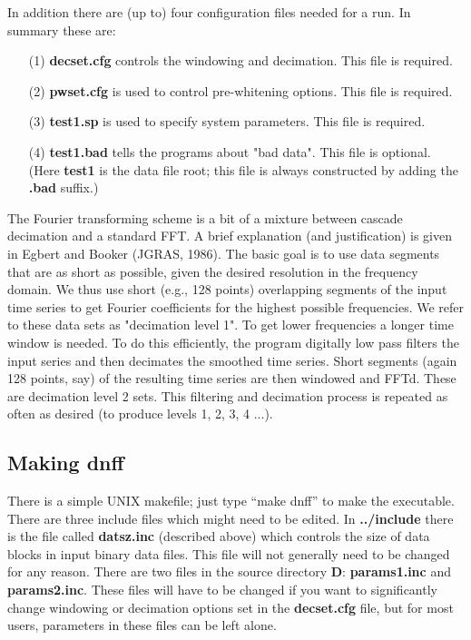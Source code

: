 In addition there are (up to) four
configuration files needed for a run.
In summary these are:
\begin{itemize}
\item[(1)]
{\bf decset.cfg}
controls the windowing and decimation.
This file is required.
\item[(2)]
{\bf pwset.cfg} is used to control pre-whitening options.
This file is required.
\item[(3)]
{\bf test1.sp}
is used to specify system parameters.
This file is required.
\item[(4)]
{\bf test1.bad}
tells the programs about "bad data".
This file is optional.
(Here {\bf test1 }is the data file root; this file is always constructed
by adding the {\bf .bad} suffix.)
\end{itemize}

The Fourier transforming scheme is a bit of a mixture between
cascade decimation and a standard FFT.
A brief explanation (and justification) is given in Egbert
and Booker (JGRAS, 1986).
The basic goal is to use data segments that are as short as possible,
given the desired resolution in the frequency domain.
We thus use short (e.g., 128 points) overlapping segments of the input time
series to get Fourier coefficients for the highest possible
frequencies.  We refer to these data sets as "decimation level 1".
To get lower frequencies a longer time window is needed.
To do this efficiently, the program digitally low pass filters
the input series and then decimates the smoothed time series.
Short segments (again 128 points, say) of the resulting time series are then
windowed and FFTd.  These are decimation level 2 sets.
This filtering and decimation process is repeated as often as desired
(to produce levels 1, 2, 3, 4 ...).

\subsection{Making dnff}

There is a simple UNIX makefile; just type ``make dnff''
to make the executable.  There are three include files
which might need to be edited.  In {\bf ../include}
there is the file called {\bf datsz.inc} (described above)
which controls the size of data blocks in input binary data files.
This file will not generally need to be changed for any reason.
There are two files in the source directory {\bf D}:
{\bf params1.inc} and {\bf params2.inc}.  These files will have
to be changed if you want to significantly change windowing or
decimation options set in the {\bf decset.cfg} file, but for
most users, parameters in these files can be left alone.

